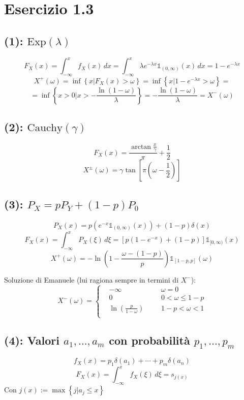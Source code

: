 \documentclass{article}
\begin{document}
\section{Esercizio 1.3}
\subsection{(1): $\mathrm{Exp}(\lambda)$}
\[
	F_X(x)= \int_{-\infty }^{x}f_X(x)\,dx = \int_{-\infty }^{x} \lambda e^{-\lambda x} \mathds{1}_{(0,\infty )}(x) \,dx = 1-e^{-\lambda x}
\]
\[
	X^+(\omega) = \inf\left\{x| F_X(x)>\omega\right\} = \inf\left\{x| 1-e^{-\lambda x} > \omega\right\} = 
\]
\[	= \inf\left\{x>0| x>- \frac{\ln\left(1 - \omega\right)}{\lambda} \right\} = - \frac{\ln\left(1 - \omega\right)}{\lambda} = X^-(\omega )\]

\subsection{(2): $\mathrm{Cauchy}(\gamma)$}
\[
	F_X(x) = \frac{\arctan \frac{x}{\gamma}}{\pi} + \frac{1}{2}
\]
\[
	X^\pm(\omega) = \gamma \tan \left[\pi\left(\omega - \frac{1}{2}\right)\right]
\]


\subsection{(3): $P_X = pP_Y + (1-p)P_0$}
\[
	P_X(x) = p\left(e^{-x} \mathds{1}_{(0,\infty )}(x)\right) + (1-p) \delta(x)
\]
\[
	F_X(x) = \int_{-\infty }^{x} P_X \left(\xi\right) \, d\xi = \left[p\left(1-e^{-x}\right) + \left(1-p\right)\right] \mathds{1}_{[0,\infty )} (x)
\]
\[
	X^+(\omega) = -\ln \left(1- \frac{\omega-(1-p)}{p}\right) \mathds{1}_{[1-p,p]}(\omega)
\]

Soluzione di Emanuele (lui ragiona sempre in termini di $X^-$):
\[
	X^-(\omega )= \left\{\begin{aligned}
		&-\infty & & & \omega =0\\
		& 0 & & & 0<\omega \leq 1-p\\
		& \ln\left(\frac{p}{1-\omega }\right) & & & 1-p<\omega <1\\
	\end{aligned}\right.
\]

\subsection{(4): Valori $a_1, \dotsc, a_m$ con probabilità $p_1, \dotsc, p_m$}
\[
	f_X(x) = p_1 \delta(a_1) + \dotsb + p_m \delta(a_n)
\]
\[
	F_X(x) = \int_{-\infty }^{x} f_X \left(\xi\right) \, d\xi = s_{j(x)}
\]
Con $j(x) := \max\left\{j | a_j\leq x\right\}$
\end{document}
